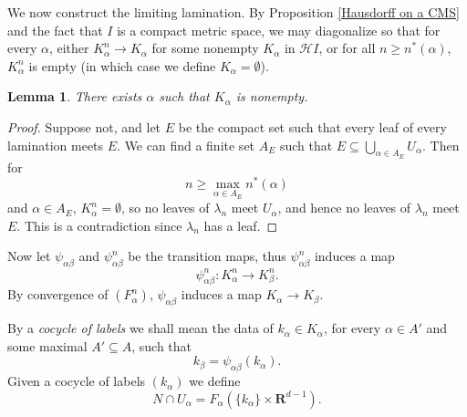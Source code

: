 \documentclass[reqno,11pt]{amsart}
\newcommand{\RR}{\mathbf{R}}
\newcommand{\Hypspace}{\mathscr H}
\newcommand{\dfn}[1]{\emph{#1}\index{#1}}
\newtheorem{lemma}[theorem]{Lemma}
\theoremstyle{definition}
\numberwithin{equation}{section}
\begin{document}
We now construct the limiting lamination.
By Proposition \ref{Hausdorff on a CMS} and the fact that $I$ is a compact metric space, we may diagonalize so that for every $\alpha$, either $K^n_\alpha \to K_\alpha$ for some nonempty $K_\alpha$ in $\Hypspace I$, or for all $n \geq n^*(\alpha)$, $K_\alpha^n$ is empty (in which case we define $K_\alpha = \emptyset$).

\begin{lemma}\label{label sets are nonempty}
	There exists $\alpha$ such that $K_\alpha$ is nonempty.
\end{lemma}
\begin{proof}
	Suppose not, and let $E$ be the compact set such that every leaf of every lamination meets $E$.
	We can find a finite set $A_E$ such that $E \subseteq \bigcup_{\alpha \in A_E} U_\alpha$. Then for
	$$n \geq \max_{\alpha \in A_E} n^*(\alpha)$$
	and $\alpha \in A_E$, $K_\alpha^n = \emptyset$, so no leaves of $\lambda_n$ meet $U_\alpha$, and hence no leaves of $\lambda_n$ meet $E$.
	This is a contradiction since $\lambda_n$ has a leaf.
\end{proof}

Now let $\psi_{\alpha \beta}$ and $\psi_{\alpha \beta}^n$ be the transition maps, thus $\psi_{\alpha \beta}^n$ induces a map
$$\psi_{\alpha \beta}^n: K_\alpha^n \to K_\beta^n.$$
By convergence of $(F_\alpha^n)$, $\psi_{\alpha \beta}$ induces a map $K_\alpha \to K_\beta$.

By a \dfn{cocycle of labels} we shall mean the data of $k_\alpha \in K_\alpha$, for every $\alpha \in A'$ and some maximal $A' \subseteq A$, such that 
$$k_\beta = \psi_{\alpha \beta}(k_\alpha).$$
Given a cocycle of labels $(k_\alpha)$ we define
\begin{equation}\label{cocycle implies hypersurface}
	N \cap U_\alpha = F_\alpha(\{k_\alpha\} \times \RR^{d - 1}).
\end{equation}
\end{document}
